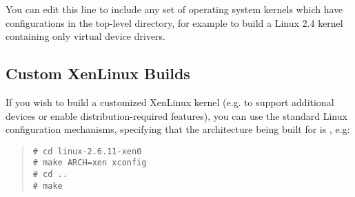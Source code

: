 You can edit this line to include any set of operating system kernels
which have configurations in the top-level 
directory, for example  to build a Linux 2.4
kernel containing only virtual device drivers.







\subsection{Custom XenLinux Builds}


If you wish to build a customized XenLinux kernel (e.g. to support
additional devices or enable distribution-required features), you can
use the standard Linux configuration mechanisms, specifying that the
architecture being built for is , e.g:
\begin{quote}
\begin{verbatim}
# cd linux-2.6.11-xen0
# make ARCH=xen xconfig
# cd ..
# make
\end{verbatim}
\end{quote}

